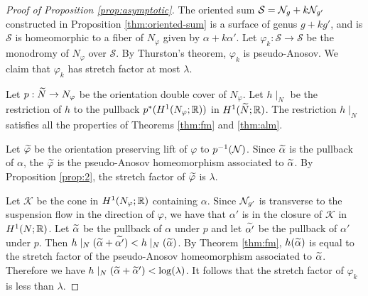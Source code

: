 \begin{proof}[Proof of Proposition \ref{prop:asymptotic}]
The oriented sum $\mathcal{S}=\mathcal{N}_g+k\mathcal{N}_{g'}$ constructed in Proposition \ref{thm:oriented-sum} is a surface of genus $g+kg'$, and is $\mathcal{S}$ is homeomorphic to a fiber of $N_\varphi$ given by $\alpha+k\alpha'$.  Let $\varphi_{k}:\mathcal{S}\rightarrow\mathcal{S}$ be the monodromy of $N_\varphi$ over $\mathcal{S}$.  By Thurston's theorem, $\varphi_k$ is pseudo-Anosov.  We claim that $\varphi_k$ has stretch factor at most $\lambda$.


Let $p:\widetilde{N}\rightarrow N_\varphi$ be the orientation double cover of $N_\varphi$. Let $h\mid_{N}$ be the restriction of $h$ to the pullback  $p^\ast(H^1(N_\varphi; \mathbb{R}))$ in $H^1(\widetilde{N}; \mathbb{R})$.
The restriction $h\mid_N$ satisfies all the properties of Theorems \ref{thm:fm} and \ref{thm:alm}.

 Let $\widetilde{\varphi}$ be the orientation preserving lift of $\varphi$ to $p^{-1}(\mathcal{N})$.  Since $\widetilde{\alpha}$ is the pullback of $\alpha$, the $\widetilde{\varphi}$ is the pseudo-Anosov homeomorphism associated to $\widetilde{\alpha}$.  By Proposition \ref{prop:2}, the stretch factor of $\widetilde{\varphi}$ is $\lambda$.

Let $\mathcal{K}$ be the cone in $H^1(N_\varphi;\mathbb{R})$ containing $\alpha$.  Since $\mathcal{N}_{g'}$ is transverse to the suspension flow in the direction of $\varphi$, we have that $\alpha'$ is in the closure of $\mathcal{K}$ in $H^1(N;\mathbb{R})$.  Let $\widetilde{\alpha}$ be the pullback of $\alpha$ under $p$ and let $\widetilde{\alpha'}$ be the pullback of $\alpha'$ under $p$.  Then $h\mid_N(\widetilde{\alpha}+\widetilde{\alpha'})<h\mid_N(\widetilde{\alpha})$.  By Theorem \ref{thm:fm}, $h(\widetilde{\alpha})$ is equal to the stretch factor of the pseudo-Anosov homeomorphism associated to $\widetilde{\alpha}$.  Therefore we have $h\mid_N(\widetilde{\alpha}+\widetilde{\alpha}')<\log(\lambda)$. It follows that the stretch factor of $\varphi_k$ is less than $\lambda$.
\end{proof}

